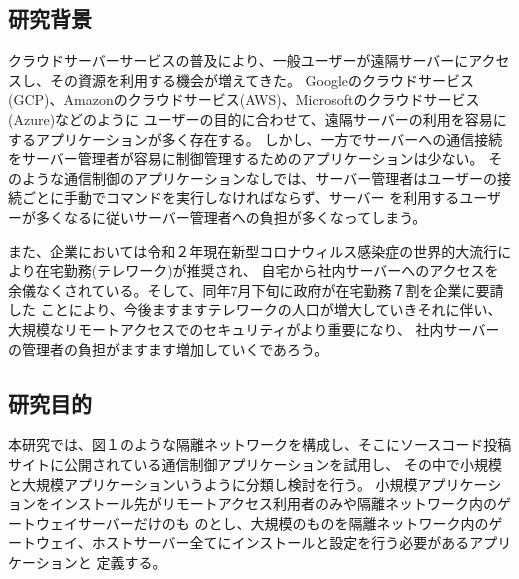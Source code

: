 \documentclass[12pt,a4paper,titlepage]{jsarticle}
\begin{document}
\subsection{研究背景}
クラウドサーバーサービスの普及により、一般ユーザーが遠隔サーバーにアクセスし、その資源を利用する機会が増えてきた。
Googleのクラウドサービス(GCP)、Amazonのクラウドサービス(AWS)、Microsoftのクラウドサービス(Azure)などのように
ユーザーの目的に合わせて、遠隔サーバーの利用を容易にするアプリケーションが多く存在する。
しかし、一方でサーバーへの通信接続をサーバー管理者が容易に制御管理するためのアプリケーションは少ない。
そのような通信制御のアプリケーションなしでは、サーバー管理者はユーザーの接続ごとに手動でコマンドを実行しなければならず、サーバー
を利用するユーザーが多くなるに従いサーバー管理者への負担が多くなってしまう。\par
また、企業においては令和２年現在新型コロナウィルス感染症の世界的大流行により在宅勤務(テレワーク)が推奨され、
自宅から社内サーバーへのアクセスを余儀なくされている。そして、同年7月下旬に政府が在宅勤務７割を企業に要請した\cite{covid_nikkei}
ことにより、今後ますますテレワークの人口が増大していきそれに伴い、大規模なリモートアクセスでのセキュリティがより重要になり、
社内サーバーの管理者の負担がますます増加していくであろう。\par 







\subsection{研究目的}
本研究では、図１のような隔離ネットワークを構成し、そこにソースコード投稿サイトに公開されている通信制御アプリケーションを試用し、
その中で小規模と大規模アプリケーションいうように分類し検討を行う。
小規模アプリケーションをインストール先がリモートアクセス利用者のみや隔離ネットワーク内のゲートウェイサーバーだけのも
のとし、大規模のものを隔離ネットワーク内のゲートウェイ、ホストサーバー全てにインストールと設定を行う必要があるアプリケーションと
定義する。
\end{document}
